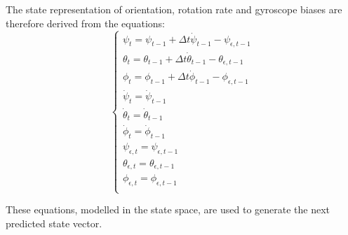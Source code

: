 \documentclass[12pt]{article}
\begin{document}
The state representation of orientation, rotation rate and gyroscope biases are therefore derived from the equations:
\begin{equation}
    \left\{   \begin{array}{c} 
         \psi_t = \psi_{t -1} + \Delta t \dot \psi_{t - 1} -  \psi_{\epsilon, t - 1} \\
         \theta_t = \theta_{t -1} + \Delta t \dot \theta_{t - 1} -  \theta_{\epsilon, t - 1} \\
         \phi_t = \phi_{t -1} + \Delta t \dot \phi_{t - 1} - \phi_{\epsilon, t - 1} \\
         \dot \psi_t = \dot \psi_{t -1}   \\
         \dot \theta_t = \dot \theta_{t -1}  \\
         \dot \phi_t = \dot \phi_{t -1}  \\
         \psi_{\epsilon, t} = \psi_{\epsilon, t - 1}  \\
         \theta_{\epsilon, t} = \theta_{\epsilon, t - 1}  \\
         \phi_{\epsilon, t} = \phi_{\epsilon, t - 1}  \\ 
    \end{array}  \right.  
\end{equation} 

These equations, modelled in the state space, are used to generate the next predicted state vector. 
\end{document}
